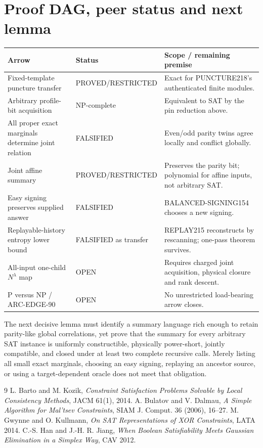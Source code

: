 \documentclass[11pt]{article}
\begin{document}
\section{Proof DAG, peer status and next lemma}
\begin{center}\small
\begin{tabular}{p{.31\linewidth}p{.17\linewidth}p{.42\linewidth}}
\toprule
Arrow & Status & Scope / remaining premise\\\midrule
Fixed-template puncture transfer & PROVED/RESTRICTED & Exact for PUNCTURE218's authenticated finite modules.\\
Arbitrary profile-bit acquisition & NP-complete & Equivalent to SAT by the pin reduction above.\\
All proper exact marginals determine joint relation & FALSIFIED & Even/odd parity twins agree locally and conflict globally.\\
Joint affine summary & PROVED/RESTRICTED & Preserves the parity bit; polynomial for affine inputs, not arbitrary SAT.\\
Easy signing preserves supplied answer & FALSIFIED & BALANCED-SIGNING154 chooses a new signing.\\
Replayable-history entropy lower bound & FALSIFIED as transfer & REPLAY215 reconstructs by rescanning; one-pass theorem survives.\\
All-input one-child $N^\lambda$ map & OPEN & Requires charged joint acquisition, physical closure and rank descent.\\
P versus NP / ARC-EDGE-90 & OPEN & No unrestricted load-bearing arrow closes.\\
\bottomrule
\end{tabular}
\end{center}

The next decisive lemma must identify a summary language rich enough to retain parity-like global correlations, yet prove that the summary for every arbitrary SAT instance is uniformly constructible, physically power-short, jointly compatible, and closed under at least two complete recursive calls.  Merely listing all small exact marginals, choosing an easy signing, replaying an ancestor source, or using a target-dependent oracle does not meet that obligation.

\begin{thebibliography}{9}
 L. Barto and M. Kozik, \emph{Constraint Satisfaction Problems Solvable by Local Consistency Methods}, JACM 61(1), 2014.
 A. Bulatov and V. Dalmau, \emph{A Simple Algorithm for Mal'tsev Constraints}, SIAM J. Comput. 36 (2006), 16--27.
 M. Gwynne and O. Kullmann, \emph{On SAT Representations of XOR Constraints}, LATA 2014.
 C.-S. Han and J.-H. R. Jiang, \emph{When Boolean Satisfiability Meets Gaussian Elimination in a Simplex Way}, CAV 2012.
\end{thebibliography}
\end{document}
